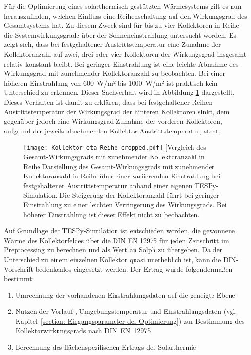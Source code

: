 Für die Optimierung eines solarthermisch gestützten Wärmesystems gilt es nun herauszufinden, welchen Einfluss eine Reihenschaltung auf den Wirkungsgrad des Gesamtsystems hat. Zu diesem Zweck sind für bis zu vier Kollektoren in Reihe die Systemwirkungsgrade über der Sonneneinstrahlung untersucht worden. Es zeigt sich, dass bei festgehaltener Austrittstemperatur eine Zunahme der Kollektoranzahl auf zwei, drei oder vier Kollektoren der Wirkungsgrad insgesamt relativ konstant bleibt. Bei geringer Einstrahlung ist eine leichte Abnahme des Wirkungsgrad mit zunehmender Kollektoranzahl zu beobachten. Bei einer höheren Einstrahlung von 600~W/m² bis 1000~W/m² ist praktisch kein Unterschied zu erkennen. Dieser Sachverhalt wird in Abbildung \ref{fig: TESPy Vergleich mehrerer Kollektoren in Reihe} dargestellt. Dieses Verhalten ist damit zu erklären, dass bei festgehaltener Reihen-Austrittstemperatur der Wirkungsgrad der hinteren Kollektoren sinkt, dem gegenüber jedoch eine Wirkungsgrad-Zunahme der vorderen Kollektoren, aufgrund der jeweils abnehmenden Kollektor-Austrittstemperatur, steht. 
	\begin{figure}[ht]
		\centering
		\texttt{[image: Kollektor\_eta\_Reihe-cropped.pdf]}
		[Vergleich des Gesamt-Wirkungsgrads mit zunehmender Kollektoranzahl in Reihe]{Darstellung des Gesamt-Wirkungsgrads mit zunehmender Kollektoranzahl in Reihe über einer variierenden Einstrahlung bei festgehaltener Austrittstemperatur anhand einer eigenen \ac{TESPy}-Simulation. Die Steigerung der Kollektoranzahl führt bei geringer Einstrahlung zu einer leichten Verringerung des Wirkungsgrads. Bei höherer Einstrahlung ist dieser Effekt nicht zu beobachten.}
		\label{fig: TESPy Vergleich mehrerer Kollektoren in Reihe}
	\end{figure}

Auf Grundlage der \ac{TESPy}-Simulation ist entschieden worden, die gewonnene Wärme des Kollektorfeldes über die DIN EN 12975 \cite{EN12975} für jeden Zeitschritt im Preprocessing zu berechnen und als Wert an Solph zu übergeben. Da der Unterschied zu einem einzelnen Kollektor quasi unerheblich ist, kann die DIN-Vorschrift bedenkenlos eingesetzt werden. Der Ertrag wurde folgendermaßen bestimmt:
	\begin{enumerate}
		\item Umrechnung der vorhandenen Einstrahlungsdaten auf die geneigte Ebene
		\item Nutzen der Vorlauf-, Umgebungstemperatur und Einstrahlungsdaten (vgl. Kapitel~\ref{section: Eingangsparameter der Optimierung}) zur Bestimmung des Kollektorwirkungsgrads nach DIN~EN~12975
		\item Berechnung des flächenspezifischen Ertrags der Solarthermie
	\end{enumerate} 

